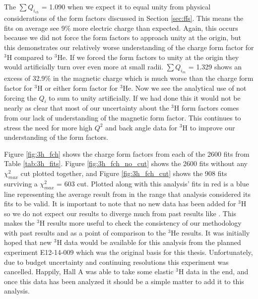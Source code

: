 The $\sum Q_{i_{ch}}$ = 1.090 when we expect it to equal unity from physical considerations of the form factors discussed in Section \ref{sec:ffs}. This means the fits on average see 9$\%$ more electric charge than expected. Again, this occurs because we did not force the form factors to approach unity at the origin, but this demonstrates our relatively worse understanding of the charge form factor for $^3$H compared to $^3$He. If we forced the form factors to unity at the origin they would artificially turn over even more at small radii. $\sum Q_{i_{m}}$ = 1.329 shows an excess of 32.9$\%$ in the magnetic charge which is much worse than the charge form factor for $^3$H or either form factor for $^3$He. Now we see the analytical use of not forcing the $Q_i$ to sum to unity artificially. If we had done this it would not be nearly as clear that most of our uncertainty about the $^3$H form factors comes from our lack of understanding of the magnetic form factor. This continues to stress the need for more high $Q^2$ and back angle data for $^3$H to improve our understanding of the form factors.%

Figure \ref{fig:3h_fch} shows the charge form factors from each of the 2600 fits from Table \ref{tab:3h_fits}. Figure \ref{fig:3h_fch_no_cut} shows the 2600 fits without any $\chi^2_{max}$ cut plotted together, and Figure \ref{fig:3h_fch_cut} shows the 908 fits surviving a $\chi^2_{max}$ = 603 cut. Plotted along with this analysis' fits in red is a blue line representing the average result from \cite{Article:Amroun} in the range that analysis considered its fits to be valid. It is important to note that no new data has been added for $^3$H so we do not expect our results to diverge much from past results like \cite{Article:Amroun}. This makes the $^3$H results more useful to check the consistency of our methodology with past results and as a point of comparison to the $^3$He results. It was initially hoped that new $^3$H data would be available for this analysis from the planned experiment E12-14-009 \cite{3h_proposal} which was the original basis for this thesis. Unfortunately, due to budget uncertainty and continuing resolutions this experiment was cancelled. Happily, Hall A was able to take some elastic $^3$H data in the end, and once this data has been analyzed it should be a simple matter to add it to this analysis.

